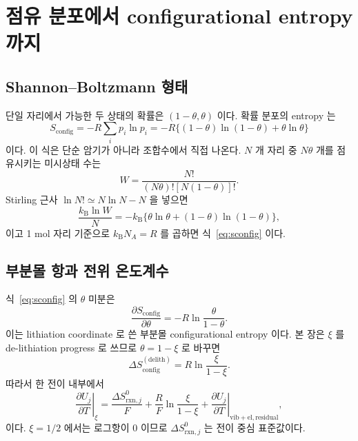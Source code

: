 \documentclass[11pt,a4paper]{article}
\newcommand{\rxn}{\mathrm{rxn}}
\newcommand{\config}{\mathrm{config}}
\newcommand{\vib}{\mathrm{vib}}
\newcommand{\el}{\mathrm{el}}
\begin{document}
\section{점유 분포에서 configurational entropy 까지}
\label{sec:config_entropy}
\subsection{Shannon--Boltzmann 형태}
단일 자리에서 가능한 두 상태의 확률은 $(1-\theta,\theta)$ 이다. 확률 분포의 entropy 는
\begin{equation}
S_{\config}
  =-R\sum_i p_i\ln p_i
  =-R\{(1-\theta)\ln(1-\theta)+\theta\ln\theta\}
\label{eq:sconfig}
\end{equation}
이다. 이 식은 단순 암기가 아니라 조합수에서 직접 나온다. $N$ 개 자리 중 $N\theta$ 개를 점유시키는
미시상태 수는
\begin{equation}
W=\frac{N!}{(N\theta)![N(1-\theta)]!}.
\label{eq:multiplicity}
\end{equation}
Stirling 근사 $\ln N!\simeq N\ln N-N$ 을 넣으면
\begin{equation}
\frac{k_{\mathrm B}\ln W}{N}
  =-k_{\mathrm B}\{\theta\ln\theta+(1-\theta)\ln(1-\theta)\},
\label{eq:stirling_s}
\end{equation}
이고 1 mol 자리 기준으로 $k_{\mathrm B}N_A=R$ 를 곱하면 식~\eqref{eq:sconfig} 이다.

\subsection{부분몰 항과 전위 온도계수}
식~\eqref{eq:sconfig} 의 $\theta$ 미분은
\begin{equation}
\frac{\partial S_{\config}}{\partial\theta}
  =-R\ln\frac{\theta}{1-\theta}.
\label{eq:partial_s_lith}
\end{equation}
이는 lithiation coordinate 로 쓴 부분몰 configurational entropy 이다. 본 장은 $\xi$ 를
de-lithiation progress 로 쓰므로 $\theta=1-\xi$ 로 바꾸면
\begin{equation}
\Delta S_{\config}^{(\mathrm{delith})}
=R\ln\frac{\xi}{1-\xi}.
\label{eq:partial_s_delith}
\end{equation}
따라서 한 전이 내부에서
\begin{equation}
\left.\frac{\partial U_j}{\partial T}\right|_{\xi}
  =\frac{\Delta S_{\rxn,j}^0}{F}
  +\frac{R}{F}\ln\frac{\xi}{1-\xi}
  +\left.\frac{\partial U_j}{\partial T}\right|_{\vib+\el,\mathrm{residual}},
\label{eq:single_peak_dudt}
\end{equation}
이다. $\xi=1/2$ 에서는 로그항이 0 이므로 $\Delta S_{\rxn,j}^0$ 는 전이 중심 표준값이다.
\end{document}
